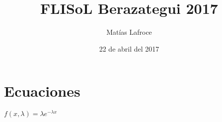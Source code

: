 \documentclass{article}
\title{FLISoL Berazategui 2017}
\author{Matías Lafroce}
\date{22 de abril del 2017}
\begin{document}
   \maketitle

   \newpage

   \tableofcontents

   \newpage
   
   \section{Ecuaciones}
   \(f(x,\lambda) = \lambda e^{- \lambda x}\)
\end{document}
